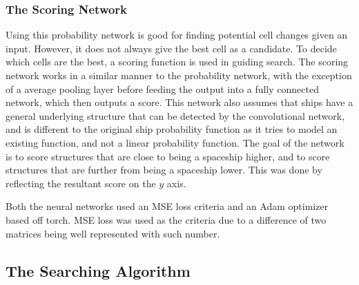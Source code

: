 \documentclass{l4proj}
\begin{document}
\subsubsection{The Scoring Network}

Using this probability network is good for finding potential cell changes given an input. However, it does not always give the best cell as a candidate. To decide which cells are the best, a scoring function is used in guiding search. The scoring network works in a similar manner to the probability network, with the exception of a average pooling layer before feeding the output into a fully connected network, which then outputs a score. This network also assumes that ships have a general underlying structure that can be detected by the convolutional network, and is different to the original ship probability function as it tries to model an existing function, and not a linear probability function. The goal of the network is to score structures that are close to being a spaceship higher, and to score structures that are further from being a spaceship lower. This was done by reflecting the resultant score on the $y$ axis.

Both the neural networks used an MSE loss criteria and an Adam optimizer based off torch. MSE loss was used as the criteria due to a difference of two matrices being well represented with such number. 

\subsection{The Searching Algorithm}





\end{document}
